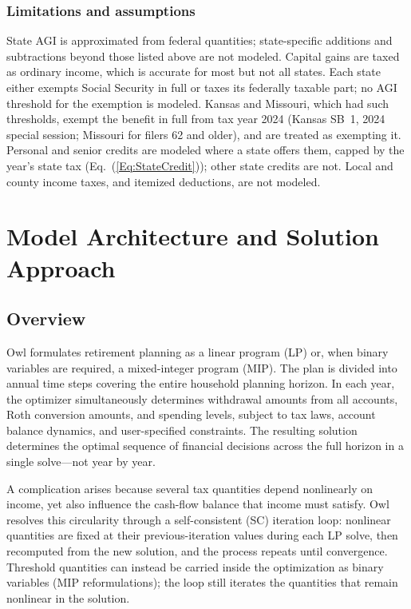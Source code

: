 \documentclass[fleqn,12pt]{report}
\begin{document}
\subsection*{Limitations and assumptions}
State AGI is approximated from federal quantities; state-specific additions and
subtractions beyond those listed above are not modeled.
Capital gains are taxed as ordinary income, which is accurate for most but not
all states.
Each state either exempts Social Security in full or taxes its federally taxable
part; no AGI threshold for the exemption is modeled. Kansas and Missouri, which
had such thresholds, exempt the benefit in full from tax year 2024 (Kansas
SB~1, 2024 special session; Missouri for filers 62 and older), and are treated
as exempting it.
Personal and senior credits are modeled where a state offers them, capped by the
year's state tax (Eq.~(\ref{Eq:StateCredit})); other state credits are not.
Local and county income taxes, and itemized deductions, are not modeled.

\chapter{Model Architecture and Solution Approach}
\label{Chap:Architecture}

\section{Overview}

Owl formulates retirement planning as a linear program (LP) or, when
binary variables are required, a mixed-integer program (MIP).
The plan is divided into annual time steps covering the entire household
planning horizon.
In each year, the optimizer simultaneously determines withdrawal amounts
from all accounts, Roth conversion amounts, and spending levels, subject to
tax laws, account balance dynamics, and user-specified constraints.
The resulting solution determines the optimal sequence of financial
decisions across the full horizon in a single solve---not year by year.

A complication arises because several tax quantities depend nonlinearly on
income, yet also influence the cash-flow balance that income must satisfy.
Owl resolves this circularity through a self-consistent (SC) iteration
loop: nonlinear quantities are fixed at their previous-iteration values
during each LP solve, then recomputed from the new solution, and the
process repeats until convergence.
Threshold quantities can instead be carried inside the optimization as binary
variables (MIP reformulations); the loop still iterates the quantities that remain
nonlinear in the solution.
\end{document}
